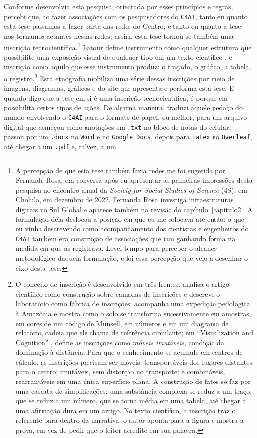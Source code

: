 Conforme desenvolvia esta pesquisa, orientada por esses princípios e regras, percebi que, ao fazer associações com os pesquisadores do \texttt{C4AI}, tanto eu quanto esta tese passamos a fazer parte das redes do Centro, e tanto eu quanto a tese nos tornamos actantes nessas redes; assim, esta tese tornou-se também uma inscrição tecnocientífica.\footnote{A percepção de que esta tese também fazia redes me foi sugerida por Fernanda Rosa, em conversa após eu apresentar as primeiras impressões desta pesquisa no encontro anual da \textit{Society for Social Studies of Science} (4S), em Cholula, em dezembro de 2022. Fernanda Rosa investiga infraestruturas digitais no Sul Global e aparece também na revisão do capítulo~\ref{capitulo2}. A formulação dela deslocou a posição em que eu me colocava até então: o que eu vinha descrevendo como acompanhamento dos cientistas e engenheiros do \texttt{C4AI} também era construção de associações que iam ganhando forma na medida em que as registrava. Levei tempo para perceber o alcance metodológico daquela formulação, e foi essa percepção que veio a desenhar o eixo desta tese.} Latour define instrumento como qualquer estrutura que possibilite uma exposição visual de qualquer tipo em um texto científico \parencite[p.~102]{Latour2011CienciaEmAcao}, e inscrição como aquilo que esse instrumento produz: o traçado, o gráfico, a tabela, o registro.\footnote{O conceito de inscrição é desenvolvido em três frentes. \textcite[caps.~1--2]{Latour2011CienciaEmAcao} analisa o artigo científico como construção sobre camadas de inscrições e descreve o laboratório como fábrica de inscrições; \textcite[cap.~2]{Latour2017Esperanca} acompanha uma expedição pedológica à Amazônia e mostra como o solo se transforma sucessivamente em amostras, em cores de um código de Munsell, em números e em um diagrama de relatório, cadeia que ele chama de referência circulante; em \enquote{Visualization and Cognition} \parencite{Latour1986Visualization}, define as inscrições como \textit{móveis imutáveis}, condição da dominação à distância. Para que o conhecimento se acumule em centros de cálculo, as inscrições precisam ser móveis, transportáveis dos lugares distantes para o centro; imutáveis, sem distorção no transporte; e combináveis, rearranjáveis em uma única superfície plana. A construção de fatos se faz por uma cascata de simplificações: uma substância complexa se reduz a um traço, que se reduz a um número, que se torna média em uma tabela, até chegar a uma afirmação dura em um artigo. No texto científico, a inscrição traz o referente para dentro da narrativa: o autor aponta para a figura e mostra a prova, em vez de pedir que o leitor acredite em sua palavra.} Esta etnografia mobiliza uma série dessas inscrições por meio de imagens, diagramas, gráficos e do site que apresenta e performa esta tese. E quando digo que a tese em si é uma inscrição tecnocientífica, é porque ela possibilita certos tipos de ações. De alguma maneira, traduzi aquele pedaço do mundo envolvendo o \texttt{C4AI} para o formato de papel, ou melhor, para um arquivo digital que começou como anotações em \texttt{.txt} no bloco de notas do celular, passou por um \texttt{.docx} no \texttt{Word} e no \texttt{Google Docs}, depois para \texttt{Latex} no \texttt{Overleaf}, até chegar a um \texttt{.pdf} e, talvez, a um 